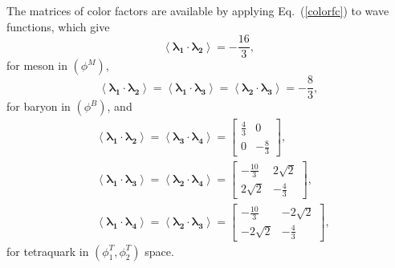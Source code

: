 \documentclass[prd,twocolumn,floatfix,nofootinbib]{revtex4}
\begin{document}
The matrices of color factors are available by applying Eq.~(\ref{colorfc}) to wave functions, which give
\begin{equation}\label{cfcM}
    \left\langle \boldsymbol{\lambda_{1}}\cdot \boldsymbol{\lambda_{2}} \right\rangle=-\frac{16}{3},
\end{equation}
for meson in $(\phi^{M})$,
\begin{equation}\label{cfcB}
    \left\langle \boldsymbol{\lambda_{1}}\cdot \boldsymbol{\lambda_{2}} \right\rangle=
    \left\langle \boldsymbol{\lambda_{1}}\cdot \boldsymbol{\lambda_{3}} \right\rangle=
    \left\langle \boldsymbol{\lambda_{2}}\cdot \boldsymbol{\lambda_{3}} \right\rangle=-\frac{8}{3},
\end{equation}
for baryon in $(\phi^{B})$, and
\begin{equation}\label{cfcT}
    \begin{aligned}
        &\left\langle \boldsymbol{\lambda_{1}}\cdot \boldsymbol{\lambda_{2}} \right\rangle=
        \left\langle \boldsymbol{\lambda_{3}}\cdot \boldsymbol{\lambda_{4}} \right\rangle=
        \begin{bmatrix}
            \frac{4}{3} & 0 \\
            0 & -\frac{8}{3}
        \end{bmatrix}, \\
        &\left\langle \boldsymbol{\lambda_{1}}\cdot \boldsymbol{\lambda_{3}} \right\rangle=
        \left\langle \boldsymbol{\lambda_{2}}\cdot \boldsymbol{\lambda_{4}} \right\rangle=
        \begin{bmatrix}
            -\frac{10}{3} & 2\sqrt{2} \\
            2\sqrt{2} & -\frac{4}{3}
        \end{bmatrix}, \\
        &\left\langle \boldsymbol{\lambda_{1}}\cdot \boldsymbol{\lambda_{4}} \right\rangle=
        \left\langle \boldsymbol{\lambda_{2}}\cdot \boldsymbol{\lambda_{3}} \right\rangle=
        \begin{bmatrix}
            -\frac{10}{3} & -2\sqrt{2} \\
            -2\sqrt{2} & -\frac{4}{3}
        \end{bmatrix},
    \end{aligned}
\end{equation}
for tetraquark in $(\phi_{1}^{T},\phi_{2}^{T})$ space.


\medskip
\end{document}
